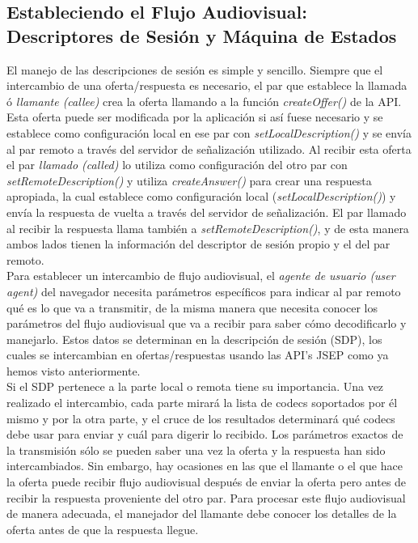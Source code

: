 \subsection{Estableciendo el Flujo Audiovisual: Descriptores de Sesión y Máquina de Estados}


El manejo de las descripciones de sesión es simple y sencillo. Siempre que el intercambio de una oferta/respuesta es necesario, el par que establece la llamada ó \textit{llamante (callee)} crea la oferta llamando a la función \emph{createOffer()} de la API. Esta oferta puede ser modificada por la aplicación si así fuese necesario y se establece como configuración local en ese par con \emph{setLocalDescription()} y se envía al par remoto a través del servidor de señalización utilizado. Al recibir esta oferta el par \textit{llamado (called)} lo utiliza como configuración del otro par con \emph{setRemoteDescription()} y utiliza \emph{createAnswer()} para crear una respuesta apropiada, la cual establece como configuración local (\emph{setLocalDescription()}) y envía la respuesta de vuelta a través del servidor de señalización. El par llamado al recibir la respuesta llama también a \emph{setRemoteDescription()}, y de esta manera ambos lados tienen la información del descriptor de sesión propio y el del par remoto.\\ 

Para establecer un intercambio de flujo audiovisual, el \textit{agente de usuario (user agent)} del navegador necesita parámetros específicos para indicar al par remoto qué es lo que va a transmitir, de la misma manera que necesita conocer los parámetros del flujo audiovisual que va a recibir para saber cómo decodificarlo y manejarlo. Estos datos se determinan en la descripción de sesión (SDP), los cuales se intercambian en ofertas/respuestas usando las API's JSEP como ya hemos visto anteriormente.\\

Si el SDP pertenece a la parte local o remota tiene su importancia. Una vez realizado el intercambio, cada parte mirará la lista de codecs soportados por él mismo y por la otra parte, y el cruce de los resultados determinará qué codecs debe usar para enviar y cuál para digerir lo recibido. Los parámetros exactos de la transmisión sólo se pueden saber una vez la oferta y la respuesta han sido intercambiados. Sin embargo, hay ocasiones en las que el llamante o el que hace la oferta puede recibir flujo audiovisual después de enviar la oferta pero antes de recibir la respuesta proveniente del otro par. Para procesar este flujo audiovisual de manera adecuada, el manejador del llamante debe conocer los detalles de la oferta antes de que la respuesta llegue.\\

